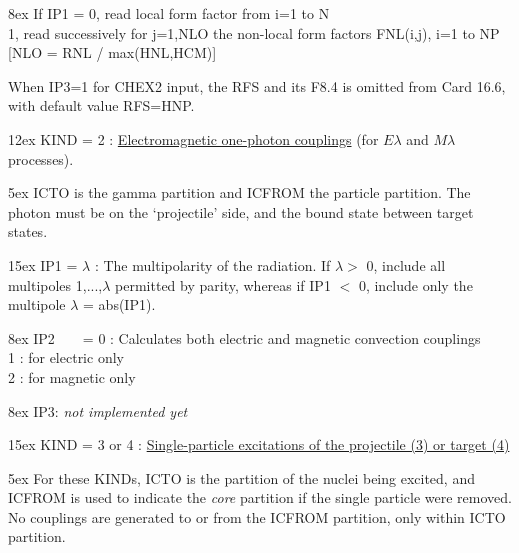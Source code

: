 \documentclass[11pt]{article}
\begin{document}
\hangindent 8ex  If IP1 =
      0, read local form factor from i=1 to N
\\  1, read successively for j=1,NLO the non-local form factors
 FNL(i,j), i=1 to NP   [NLO = RNL / max(HNL,HCM)]


When IP3=1 for CHEX2 input, the RFS and its F8.4 is omitted from Card 16.6,
with default value RFS=HNP.
\bigskip


\hangindent 12ex
KIND = 2 :
\underline{Electromagnetic one-photon couplings} (for $E\lambda$ and
$M\lambda$ processes).


\hangindent 5ex
 ICTO is the gamma partition and ICFROM the particle partition.
 The photon must be on the `projectile' side, and the bound state between
 target states.

\hangindent 15ex
 IP1 = $\lambda$ : The multipolarity of the radiation.
 If $\lambda >$ 0, include all multipoles 1,...,$\lambda$
permitted by parity, whereas if IP1 $<$ 0, include only the multipole
$\lambda$ = abs(IP1).
%

\hangindent 8ex  IP2 
~ ~   = 0 : Calculates both electric and magnetic convection couplings
\\    1 : for electric only
\\    2 : for magnetic only %



\hangindent 8ex  IP3:  {\em not implemented yet}



\bigskip

\hangindent 15ex
KIND = 3 or 4 :
\underline{Single-particle excitations of the projectile (3) or target (4)}


\hangindent 5ex
 For these KINDs, ICTO is the partition of the nuclei being excited,
and ICFROM is used to indicate the
{\em core} partition if the single particle were removed.  No couplings are
generated to or from the ICFROM partition, only within ICTO partition.
\end{document}
